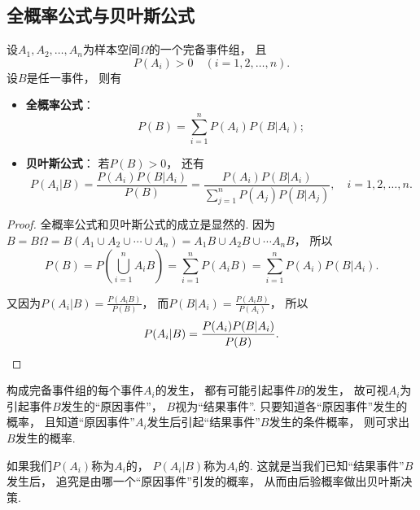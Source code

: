 \subsection{全概率公式与贝叶斯公式}
\begin{theorem}
设\(A_1,A_2,\dotsc,A_n\)为样本空间\(\Omega\)的一个完备事件组，
且\begin{equation*}
	P(A_i) > 0 \quad(i=1,2,\dotsc,n).
\end{equation*}
设\(B\)是任一事件，
则有\begin{itemize}
	\item {\rm\bf 全概率公式}：\begin{equation}\label{equation:条件概率.全概率公式}
		P(B) = \sum_{i=1}^n P(A_i) P(B \vert A_i);
	\end{equation}

	\item {\rm\bf 贝叶斯公式}：
	若\(P(B) > 0\)，
	还有\begin{equation}\label{equation:条件概率.贝叶斯公式}
		P(A_i \vert B) = \frac{P(A_i) P(B \vert A_i)}{P(B)}
		= \frac{P(A_i) P(B \vert A_i)}{\sum_{j=1}^n P(A_j) P(B \vert A_j)},
		\quad i = 1,2,\dotsc,n.
	\end{equation}
\end{itemize}
\begin{proof}
全概率公式和贝叶斯公式的成立是显然的.
因为\(B = B \Omega
= B(A_1 \cup A_2 \cup \dotsb \cup A_n)
= A_1 B \cup A_2 B \cup \dotsb A_n B\)，
所以\begin{equation*}
	P(B) = P\left(\bigcup_{i=1}^n A_i B\right)
	= \sum_{i=1}^n P(A_i B)
	= \sum_{i=1}^n P(A_i) P(B \vert A_i).
\end{equation*}

又因为\(P(A_i \vert B)
= \frac{P(A_i B)}{P(B)}\)，
而\(P(B \vert A_i)
= \frac{P(A_i B)}{P(A_i)}\)，
所以\begin{equation*}
	P(A_i \vert B) = \frac{P(A_i) P(B \vert A_i)}{P(B)}.
	\qedhere
\end{equation*}
\end{proof}
\end{theorem}

构成完备事件组的每个事件\(A_i\)的发生，
都有可能引起事件\(B\)的发生，
故可视\(A_i\)为引起事件\(B\)发生的“原因事件”，
\(B\)视为“结果事件”.
只要知道各“原因事件”发生的概率，
且知道“原因事件”\(A_i\)发生后引起“结果事件”\(B\)发生的条件概率，
则可求出\(B\)发生的概率.

如果我们\(P(A_i)\)称为\(A_i\)的，
\(P(A_i \vert B)\)称为\(A_i\)的.
这就是当我们已知“结果事件”\(B\)发生后，
追究是由哪一个“原因事件”引发的概率，
从而由后验概率做出贝叶斯决策.

